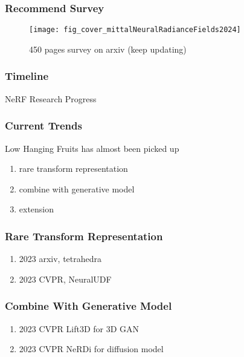 \begin{frame}
    \frametitle{Recommend Survey}
    \begin{figure}
        \texttt{[image: fig\_cover\_mittalNeuralRadianceFields2024]}
        \caption{450 pages survey on arxiv \cite{mittalNeuralRadianceFields2024} (keep updating)}
    \end{figure}
\end{frame}

\begin{frame}
    \frametitle{Timeline}
    \begin{table}
        \centering
        \tiny
        
        \caption{NeRF Research Progress}
    \end{table}

\end{frame}


\begin{frame}
    \frametitle{Current Trends}
    Low Hanging Fruits has almost been picked up
    \begin{enumerate}
        \item rare transform representation
        \item combine with generative model
        \item extension
    \end{enumerate}
\end{frame}


\begin{frame}
    \frametitle{Rare Transform Representation}
    \begin{enumerate}
        \item 2023 arxiv, tetrahedra\cite{kulhanekTetraNeRFRepresentingNeural2023}
        \item 2023 CVPR, NeuralUDF\cite{liuNeUDFLeaningNeural2023}
    \end{enumerate}
\end{frame}

\begin{frame}
    \frametitle{Combine With Generative Model}
    \begin{enumerate}
        \item 2023 CVPR Lift3D \cite{liLift3DSynthesize3D2023} for 3D GAN
        \item 2023 CVPR NeRDi \cite{dengNeRDiSingleViewNeRF2022} for diffusion model
    \end{enumerate}
\end{frame}


